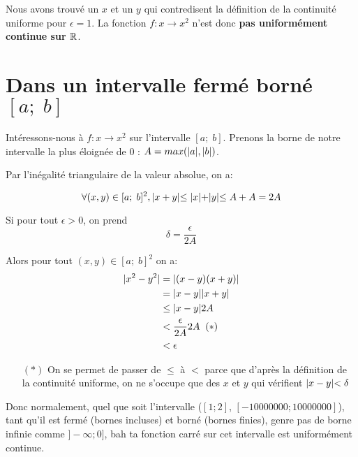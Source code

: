 \documentclass[a4paper, 14pt]{article}
\begin{document}
Nous avons trouvé un $x$ et un $y$ qui contredisent la définition de la
continuité uniforme pour $\epsilon = 1$. La fonction $f : x \to x^2$ n'est donc
\textbf{pas uniformément continue sur $\mathbb{R}$}.

\section{Dans un intervalle fermé borné $\left[a;\;b\right]$}

Intéressons-nous à $f : x \to x^2$ sur l'intervalle $\left[a;\;b\right]$.
Prenons la borne de notre intervalle la plus
éloignée de $0$ : $A = max(\lvert a \lvert, \lvert b \lvert)$.

Par l'inégalité triangulaire de la valeur absolue, on a:

\[
  \forall (x, y) \in [a;\;b]^2, \lvert x + y \lvert \le \lvert x \lvert + \lvert y \lvert \le A+A = 2A
\]

Si pour tout $\epsilon > 0$, on prend
\[
  \delta = \frac{\epsilon}{2A}
\]

Alors pour tout $(x, y) \in [a;\;b]^2$ on a:
\begin{align*}
  \lvert x^2 - y^2 \lvert &= \lvert (x - y)(x + y) \lvert\\
                  &= \lvert x-y \lvert\lvert x+y \lvert\\
                  &\le \lvert x-y \lvert2A\\
                  &< \frac{\epsilon}{2A}2A \;\; (*)\\
                  &< \epsilon
\end{align*}

\begin{itemize}
  \item[$(*)$] On se permet de passer de $\le$ à $<$ parce que d'après la
    définition de la continuité uniforme, on ne s'occupe que des $x$ et $y$ qui
    vérifient $\lvert x - y \lvert < \delta$
\end{itemize}
\bigskip


\bigskip

Donc normalement, quel que soit l'intervalle ($[1;2]$, $[-10000000;10000000]$),
tant qu'il est fermé (bornes incluses) et borné (bornes finies), genre pas de
borne infinie comme
$]-\infty; 0]$, bah ta fonction carré sur cet intervalle est uniformément
continue.
\end{document}
